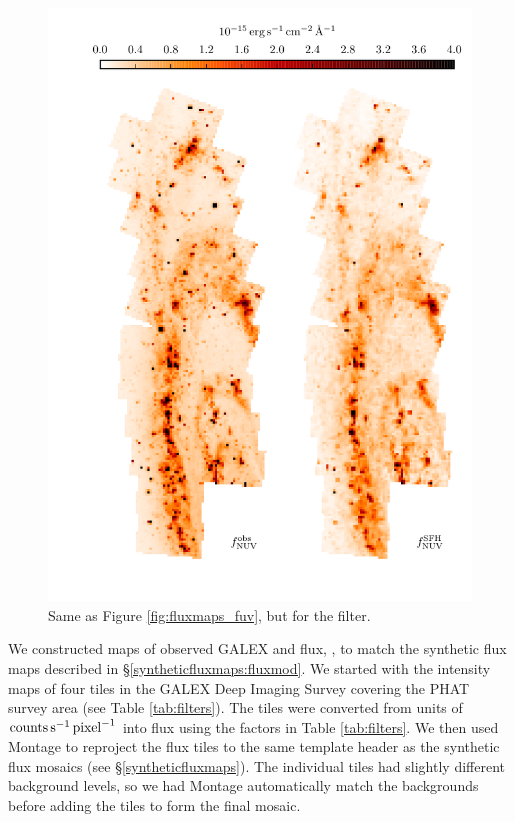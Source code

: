 \documentclass[iop, tighten]{emulateapj}
\begin{document}
\begin{figure}
\centering
\includegraphics[scale=0.9]{m31flux-figures/fluxmaps_nuv.pdf}
\caption[Observed and synthetic attenuated \nuv{} flux maps.]{Same as Figure
    \ref{fig:fluxmaps_fuv}, but for the \nuv{} filter.
}
\label{fig:fluxmaps_nuv}
\end{figure}


We constructed maps of observed GALEX \fuv{} and \nuv{} flux, \fxobs{}, to
match the synthetic flux maps described in \S \ref{syntheticfluxmaps:fluxmod}.
We started with the intensity maps of four tiles in the GALEX Deep Imaging
Survey \citep[DIS][]{Martin:2005} covering the PHAT survey area (see Table
\ref{tab:filters}). The tiles were converted from units of $\mathrm{counts}
\,\mathrm{s}^{-1} \,\mathrm{pixel}^{-1}$ into flux using the factors in Table
\ref{tab:filters}. We then used Montage to reproject the flux tiles to the same
template header as the synthetic flux mosaics (see \S \ref{syntheticfluxmaps}).
The individual tiles had slightly different background levels, so we had
Montage automatically match the backgrounds before adding the tiles to form the
final mosaic.
\end{document}
